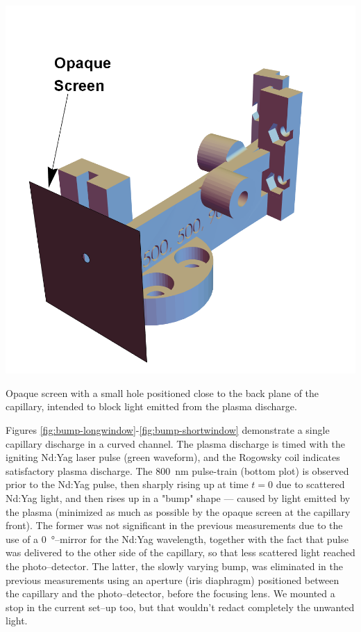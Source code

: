\documentclass[../main.tex]{subfiles}
\begin{document}
\begin{marginfigure}
\includegraphics[width=\marginparwidth]{figures/cad/opaquescreen.png}
\caption{Opaque screen with a small hole positioned close to the back plane of the capillary, intended to block light emitted from the plasma discharge.}
\label{fig:opaque}
\end{marginfigure}

Figures \ref{fig:bump-longwindow}-\ref{fig:bump-shortwindow} demonstrate a single capillary discharge in a curved channel. The plasma discharge is timed with the igniting Nd:Yag laser pulse (green waveform), and the Rogowsky coil indicates satisfactory plasma discharge. The \SI{800}{\nm} pulse-train (bottom plot) is observed prior to the Nd:Yag pulse, then sharply rising up at time $t=0$ due to scattered Nd:Yag light, and then rises up in a "bump" shape --- caused by light emitted by the plasma (minimized as much as possible by the opaque screen at the capillary front). The former was not significant in the previous measurements due to the use of a \SI{0}{\degree}--mirror for the Nd:Yag wavelength, together with the fact that pulse was delivered to the other side of the capillary, so that less scattered light reached the photo--detector. The latter, the slowly varying bump, was eliminated in the previous measurements using an aperture (iris diaphragm) positioned between the capillary and the photo--detector, before the focusing lens. We mounted a stop in the current set--up too, but that wouldn't redact completely the unwanted light.
\end{document}
